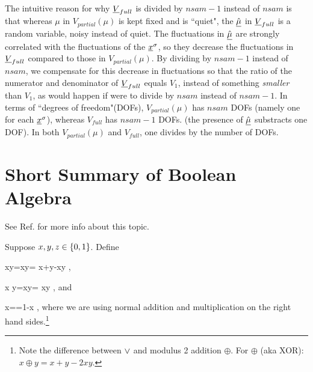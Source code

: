 The intuitive reason for
why ${\underline{V}}_{full}$
is divided
by $nsam-1$
instead of $nsam$
is that whereas $\mu$
in $V_{partial}(\mu)$
is kept fixed
and is ``quiet",
the $\underline{\hat{\mu}}$
in  ${\underline{V}}_{full}$
is a random variable,
noisy instead of quiet.
The fluctuations in
$\underline{\hat{\mu}}$
are strongly
correlated with
the fluctuations 
of the ${\underline{x}}^\sigma$,
so they decrease the
fluctuations  in ${\underline{V}}_{full}$
compared to those in
$V_{partial}(\mu)$.
By dividing by $nsam-1$
instead of $nsam$,
we compensate for this
decrease in fluctuations
so that the ratio
of the numerator 
and denominator
of  ${\underline{V}}_{full}$
equals $V_1$,
instead of something 
{\it smaller} than $V_1$,
as would happen if were to divide 
by $nsam$ instead of $nsam-1$.
In terms of ``degrees of freedom"(DOFs),
$V_{partial}(\mu)$ has $nsam$ DOFs
(namely one for each ${\underline{x}}^\sigma$),
whereas $V_{full}$
has $nsam-1$ DOFs.
(the presence of $\underline{\hat{\mu}}$
substracts one DOF).
In both $V_{partial}(\mu)$
and $V_{full}$,
one divides by the number of DOFs.



\section{Short Summary of 
Boolean Algebra} 
See Ref.\cite{wiki-bool} for more info
about this topic.

Suppose $x, y, z\in \{0,1\}$. Define

\beq
xy=x\V y= x+y-xy
\;,
\eeq

\beq
x y=x\A y= xy
\;,
\eeq
and

\beq
{}x==1-x
\;,
\eeq
where we are using
normal addition and multiplication 
on the right hand sides.\footnote{Note the
difference between $\vee$ and modulus
2 addition $\oplus$. 
For $\oplus$ (aka XOR): $x\oplus y=x+y-2xy$.}



